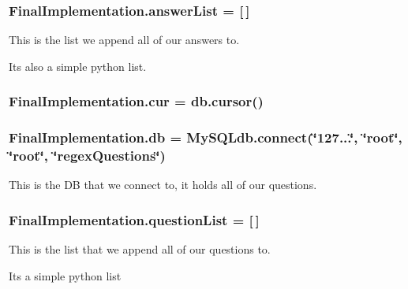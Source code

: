 \subsubsection[{\texorpdfstring{answer\+List}{answerList}}]{\setlength{\rightskip}{0pt plus 5cm}Final\+Implementation.\+answer\+List = \mbox{[}$\,$\mbox{]}}\hypertarget{namespaceFinalImplementation_a449b8b5f378a8f6fd17e7b6047c4f3a0}{}\label{namespaceFinalImplementation_a449b8b5f378a8f6fd17e7b6047c4f3a0}


This is the list we append all of our answers to. 

It\textquotesingle{}s also a simple python list. 
\subsubsection[{\texorpdfstring{cur}{cur}}]{\setlength{\rightskip}{0pt plus 5cm}Final\+Implementation.\+cur = db.\+cursor()}\hypertarget{namespaceFinalImplementation_ab2b4f562e62481705272b729fddd627d}{}\label{namespaceFinalImplementation_ab2b4f562e62481705272b729fddd627d}
\subsubsection[{\texorpdfstring{db}{db}}]{\setlength{\rightskip}{0pt plus 5cm}Final\+Implementation.\+db = My\+S\+Q\+Ldb.\+connect(\char`\"{}127...\char`\"{}, \char`\"{}root\char`\"{}, \char`\"{}root\char`\"{}, \char`\"{}regex\+Questions\char`\"{})}\hypertarget{namespaceFinalImplementation_af4b43e181e5f0130a722add3a95a106b}{}\label{namespaceFinalImplementation_af4b43e181e5f0130a722add3a95a106b}


This is the DB that we connect to, it holds all of our questions. 

\subsubsection[{\texorpdfstring{question\+List}{questionList}}]{\setlength{\rightskip}{0pt plus 5cm}Final\+Implementation.\+question\+List = \mbox{[}$\,$\mbox{]}}\hypertarget{namespaceFinalImplementation_ab67267722fb7f86dae8a04110e61ee73}{}\label{namespaceFinalImplementation_ab67267722fb7f86dae8a04110e61ee73}


This is the list that we append all of our questions to. 

It\textquotesingle{}s a simple python list 